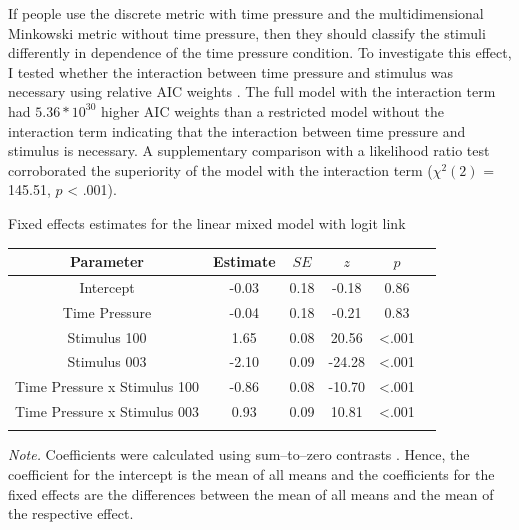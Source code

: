\documentclass[a4paper,man,natbib]{apa6}
\begin{document}
If people use the discrete metric with time pressure and the multidimensional Minkowski metric without time pressure, then they should classify the stimuli differently in dependence of the time pressure condition. To investigate this effect, I tested whether the interaction between time pressure and stimulus was necessary using relative AIC weights \citep[][p. 194]{wagenmakers2004aic}. The full model with the interaction term had $5.36 * 10^{30}$ higher AIC weights than a restricted model without the interaction term indicating that the interaction between time pressure and stimulus is necessary. A supplementary comparison with a likelihood ratio test corroborated the superiority of the model with the interaction term ($\chi^{2}(2)$ = 145.51, $p$ < .001). 

\begin{center}
\begin{threeparttable}
\caption{Fixed effects estimates for the linear mixed model with logit link}
\label{tab:estimates}
\begin{tabular*}{\textwidth}{c @{\extracolsep{\fill}} ccccc}
\toprule
\multicolumn{1}{c}{Parameter} & \multicolumn{1}{c}{Estimate} & \multicolumn{1}{c}{$SE$} & \multicolumn{1}{c}{$z$} & \multicolumn{1}{c}{$p$}\\
\midrule
\addlinespace
Intercept & -0.03 & 0.18 & -0.18 & 0.86\\
Time Pressure & -0.04 & 0.18 & -0.21 & 0.83\\
Stimulus 100 & 1.65 & 0.08 & 20.56 & <.001\\
Stimulus 003 & -2.10 & 0.09 & -24.28 & <.001\\
Time Pressure x Stimulus 100 & -0.86 & 0.08 & -10.70 & <.001\\
Time Pressure x Stimulus 003 & 0.93 & 0.09 & 10.81 & <.001\\
\bottomrule
\addlinespace
\end{tabular*}
\begin{tablenotes}[para]
\textit{Note.} Coefficients were calculated using sum--to--zero contrasts \citep{singmann2017introduction}. Hence, the coefficient for the intercept is the mean of all means and the coefficients for the fixed effects are the differences between the mean of all means and the mean of the respective effect.
\end{tablenotes}
\end{threeparttable}
\end{center}
\vspace{\baselineskip}
\end{document}
